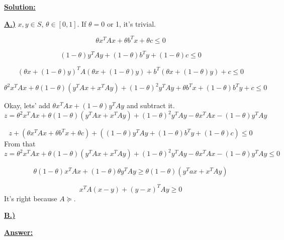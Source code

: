 \underline{\textbf{Solution:}}

\underline{\textbf{A.)}}
$x, y \in S$, $\theta \in [0, 1]$. If $\theta = 0$ or 1, it's trivial.

\begin{equation*}
    \theta x^TAx + \theta b^Tx + \theta c \leq 0
\end{equation*}

\begin{equation*}
    (1-\theta) y^TAy + (1-\theta) b^Ty + (1-\theta) c \leq 0
\end{equation*}

\begin{equation*}
    (\theta x + (1-\theta)y)^TA(\theta x + (1-\theta)y) + b^T(\theta x + (1-\theta)y) + c \leq 0
\end{equation*}

\begin{equation*}
    \theta^2 x^TAx + \theta(1-\theta)\left(y^TAx + x^TAy \right) + (1-\theta)^2 y^TAy + \theta b^Tx + (1-\theta)b^Ty + c \leq 0
\end{equation*}

Okay, lets' add $\theta x^TAx + (1-\theta)y^TAy$ and subtract it. 
\newline
$z = \theta^2 x^TAx + \theta(1-\theta)\left(y^TAx + x^TAy \right) + (1-\theta)^2 y^TAy - \theta x^TAx - (1-\theta)y^TAy $

\begin{equation*}
    z + \left(\theta x^TAx + \theta b^Tx + \theta c \right) + \left((1-\theta)y^TAy + (1-\theta)b^Ty + (1-\theta)c \right) \leq 0
\end{equation*}
From that
\begin{equation*}
    z = \theta^2 x^TAx + \theta(1-\theta)\left(y^TAx + x^TAy \right) + (1-\theta)^2 y^TAy - \theta x^TAx - (1-\theta)y^TAy  \leq 0
\end{equation*}

\begin{equation*}
    \theta(1-\theta) x^TAx + (1-\theta)\theta y^TAy \geq \theta(1-\theta)(y^Tax + x^TAy)
\end{equation*}

\begin{equation*}
    x^TA(x-y) + (y-x)^TAy \geq 0
\end{equation*}
It's right because $A \succcurlyeq$. 

\underline{\textbf{B.)}}

\underline{\textbf{Answer:}}








